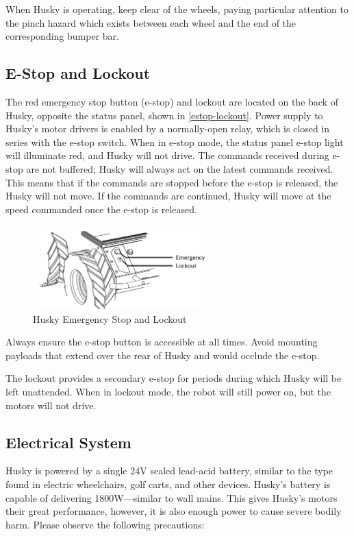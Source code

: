 \documentclass[]{clearpath-latex/clearpath-manual}
\begin{document}
When Husky is operating, keep clear of the wheels, paying particular attention to the pinch hazard which exists between each wheel and the end of the corresponding bumper bar.

\subsection{E-Stop and Lockout}

The red emergency stop button (e-stop) and lockout are located on the back of Husky, opposite the status panel, 
shown in \autoref{estop-lockout}. Power supply to Husky’s motor drivers is enabled by a normally-open relay, 
which is closed in series with the e-stop switch. When in e-stop mode, the status panel e-stop light will illuminate red, 
and Husky will not drive. The commands received during e-stop are not buffered; Husky will always act on the latest commands 
received. This means that if the commands are stopped before the e-stop is released, the Husky will not move. If the 
commands are continued, Husky will move at the speed commanded once the e-stop is released.

\begin{figure}[h]
	\centering
	\includegraphics[width=0.6\textwidth]{estop-lockout.png}
	\caption{Husky Emergency Stop and Lockout}
	\label{estop-lockout}
\end{figure}

Always ensure the e-stop button is accessible at all times. Avoid mounting payloads that extend over the rear of Husky and would occlude the e-stop.

The lockout provides a secondary e-stop for periods during which Husky will be left unattended. When in lockout mode, the robot will still power on, but the motors will not drive.

\subsection{Electrical System}
Husky is powered by a single 24V sealed lead-acid battery, similar to the type found in electric wheelchairs, golf carts, 
and other devices. Husky’s battery is capable of delivering 1800W—similar to wall mains. This gives Husky’s motors their 
great performance, however, it is also enough power to cause severe bodily harm. Please observe the following precautions:
\end{document}
